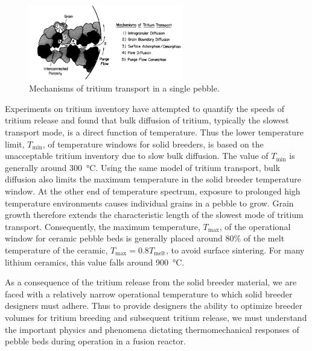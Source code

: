 \documentclass[11pt]{report} %
\begin{document}
\begin{figure}[ht]
    \centering
    \includegraphics[width=0.6\textwidth]{images/mechanisms_tritium_transport} 
    \caption{Mechanisms of tritium transport in a single pebble\cite{Federici1990}.}
    \label{fig:mechanisms_tritium_transport}
\end{figure}

Experiments on tritium inventory have attempted to quantify the speeds of tritium release and found that bulk diffusion of tritium, typically the slowest transport mode, is a direct function of temperature.\cite{Franza2013} Thus the lower temperature limit, $T_\text{min}$, of temperature windows for solid breeders, is based on the unacceptable tritium inventory due to slow bulk diffusion. The value of $T_\text{min}$ is generally around \SI{300}{\celsius}. Using the same model of tritium transport, bulk diffusion also limits the maximum temperature in the solid breeder temperature window. At the other end of temperature spectrum, exposure to prolonged high temperature environments causes individual grains in a pebble to grow. Grain growth therefore extends the characteristic length of the slowest mode of tritium transport. Consequently, the maximum temperature, $T_\text{max}$, of the operational window for ceramic pebble beds is generally placed around 80\% of the melt temperature of the ceramic, $T_\text{max} = 0.8 T_\text{melt}$, to avoid surface sintering. For many lithium ceramics, this value falls around \SI{900}{\celsius}.

As a consequence of the tritium release from the solid breeder material, we are faced with a relatively narrow operational temperature to which solid breeder designers must adhere. Thus to provide designers the ability to optimize breeder volumes for tritium breeding and subsequent tritium release, we must understand the important physics and phenomena dictating thermomechanical responses of pebble beds during operation in a fusion reactor.




\end{document}
